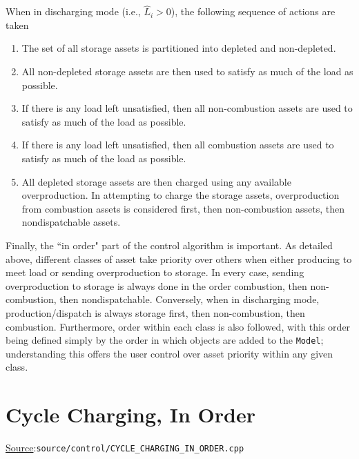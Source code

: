 \documentclass[12pt, letterpaper]{report}
\begin{document}
When in discharging mode (i.e., $\widehat{L}_i > 0$), the following sequence of actions are taken

\begin{enumerate}
    \item The set of all storage assets is partitioned into depleted and non-depleted.
    \item All non-depleted storage assets are then used to satisfy as much of the load as possible.
    \item If there is any load left unsatisfied, then all non-combustion assets are used to satisfy as much of the load as possible.
    \item If there is any load left unsatisfied, then all combustion assets are used to satisfy as much of the load as possible.
    \item All depleted storage assets are then charged using any available overproduction. In attempting to charge the storage assets, overproduction from combustion assets is considered first, then non-combustion assets, then nondispatchable assets.
\end{enumerate}

Finally, the ``in order" part of the control algorithm is important. As detailed above, different classes of asset take priority over others when either producing to meet load or sending overproduction to storage. In every case, sending overproduction to storage is always done in the order combustion, then non-combustion, then nondispatchable. Conversely, when in discharging mode, production/dispatch is always storage first, then non-combustion, then combustion. Furthermore, order within each class is also followed, with this order being defined simply by the order in which objects are added to the \texttt{Model}; understanding this offers the user control over asset priority within any given class.

\section{Cycle Charging, In Order}

\begin{large}
\noindent\underline{Source}:\quad\texttt{source/control/CYCLE\_CHARGING\_IN\_ORDER.cpp}\par
\end{large}
\vspace{5mm}
\end{document}
